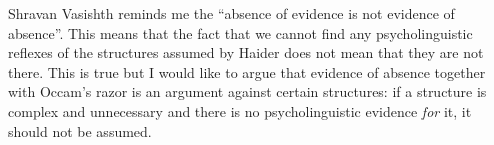 \largerpage
Shravan Vasishth reminds me the ``absence of evidence is not evidence of absence''. This means that
the fact that we cannot find any psycholinguistic reflexes of the structures assumed by Haider does
not mean that they are not there. This is true but I would like to argue that evidence of absence
together with Occam's razor is an argument against certain structures: if a structure is complex and
unnecessary and there is no psycholinguistic evidence \emph{for} it, it should not be assumed.  



